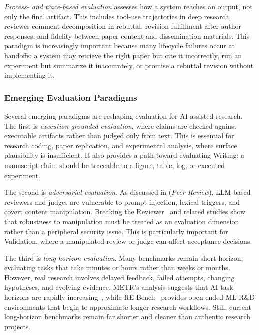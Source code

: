 \documentclass{llmxive}
\providecommand{\levelbadge}[2]{  \tcbox[on line, nobeforeafter, tcbox raise base,
         boxsep=0pt, left=2pt, right=2pt, top=0.5pt, bottom=0.5pt,
         arc=1.5pt, boxrule=0.3pt,
         colback=#1!15, colframe=#1!70]    {\scriptsize\bfseries\sffamily#2}}
\providecommand{\Ssix}{\texorpdfstring{\levelbadge{S6color}{S6}}{S6}\xspace}
\begin{document}
\emph{Process- and trace-based evaluation} assesses how a system reaches an output, not only the final artifact. This includes tool-use trajectories in deep research, reviewer-comment decomposition in rebuttal, revision fulfillment after author responses, and fidelity between paper content and dissemination materials. This paradigm is increasingly important because many lifecycle failures occur at handoffs: a system may retrieve the right paper but cite it incorrectly, run an experiment but summarize it inaccurately, or promise a rebuttal revision without implementing it.


\subsubsection{Emerging Evaluation Paradigms}
\label{sec:eval_emerging}

Several emerging paradigms are reshaping evaluation for AI-assisted research. The first is \emph{execution-grounded evaluation}, where claims are checked against executable artifacts rather than judged only from text. This is essential for research coding, paper replication, and experimental analysis, where surface plausibility is insufficient. It also provides a path toward evaluating Writing: a manuscript claim should be traceable to a figure, table, log, or executed experiment.

The second is \emph{adversarial evaluation}. As discussed in \Ssix (\emph{Peer Review}), LLM-based reviewers and judges are vulnerable to prompt injection, lexical triggers, and covert content manipulation. Breaking the Reviewer~\cite{breakingreviewer2025} and related studies show that robustness to manipulation must be treated as an evaluation dimension rather than a peripheral security issue. This is particularly important for Validation, where a manipulated review or judge can affect acceptance decisions.

The third is \emph{long-horizon evaluation}. Many benchmarks remain short-horizon, evaluating tasks that take minutes or hours rather than weeks or months. However, real research involves delayed feedback, failed attempts, changing hypotheses, and evolving evidence. METR's analysis suggests that AI task horizons are rapidly increasing~\cite{metr2025forecasting}, while RE-Bench~\cite{rebench2024} provides open-ended ML R\&D environments that begin to approximate longer research workflows. Still, current long-horizon benchmarks remain far shorter and cleaner than authentic research projects.
\end{document}
